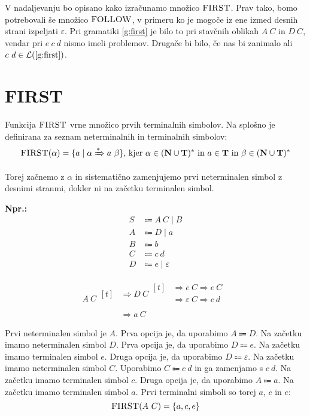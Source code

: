 \documentclass{article}
\newcommand{\Ex}{\textbf{Npr.:}\ }
\newcommand{\FIRST}{\textsc{FIRST}}
\newcommand{\FOLLOW}{\textsc{FOLLOW}}
\newcommand{\Set}[1]{\mathbf{#1}}
\newcommand{\Terminals}{\Set{T}}
\newcommand{\NonTerminals}{\Set{N}}
\newcommand{\Null}{\varepsilon}
\newcommand{\Language}[1]{\mathcal{L}(#1)}
\newcommand{\Arrow}{\Coloneqq}
\newcommand{\Derive}{\Rightarrow}
\newcommand{\DeriveStar}{\xRightarrow{\ast}}
\newcommand{\Seq}{\ }
\newcommand{\Union}{\mathrel{|}}
\newcommand{\Kleene}[1]{#1^\ast}
\begin{document}
V nadaljevanju bo opisano kako izračunamo množico $\FIRST$.
Prav tako, bomo potrebovali še množico $\FOLLOW$, v primeru ko je mogoče iz ene izmed desnih strani izpeljati $\Null$.
Pri gramatiki \ref{g:first} je bilo to pri stavčnih oblikah $A \Seq C$ in $D \Seq C$, vendar pri $e \Seq c \Seq d$ nismo imeli problemov.
Drugače bi bilo, če nas bi zanimalo ali $c \Seq d \in \Language{\text{\ref{g:first}}}$.

\section{\FIRST}

Funkcija $\FIRST$ vrne množico prvih terminalnih simbolov.
Na splošno je definirana za seznam neterminalnih in terminalnih simbolov:
\begin{equation*}
  \FIRST(\alpha) = \{ a \mid \alpha \DeriveStar a \Seq \beta \} \text{, kjer } \alpha \in \Kleene{(\NonTerminals \cup \Terminals)} \text{ in } a \in \Terminals \text{ in } \beta \in \Kleene{(\NonTerminals \cup \Terminals)}
\end{equation*}

Torej začnemo z $\alpha$ in sistematično zamenjujemo prvi neterminalen simbol z desnimi stranmi, dokler ni na začetku terminalen simbol.

\Ex
\begin{equation*}
  \begin{aligned}
    S &\Arrow A \Seq C \Union B \\
    A &\Arrow D \Union a \\
    B &\Arrow b\\
    C &\Arrow c \Seq d\\
    D &\Arrow e \Union \Null
  \end{aligned}
\end{equation*}

\begin{equation*}
  A \Seq C \begin{aligned}[t]
    &\Derive D \Seq C \begin{aligned}[t]
      &\Derive e \Seq C \Derive e \Seq C \\
      &\Derive \Null \Seq C \Derive c \Seq d \\
    \end{aligned}\\
    &\Derive a \Seq C
  \end{aligned}
\end{equation*}

Prvi neterminalen simbol je $A$.
Prva opcija je, da uporabimo $A \Arrow D$.
Na začetku imamo neterminalen simbol $D$.
Prva opcija je, da uporabimo $D \Arrow e$.
Na začetku imamo terminalen simbol $e$.
Druga opcija je, da uporabimo $D \Arrow \Null$.
Na začetku imamo neterminalen simbol $C$.
Uporabimo $C \Arrow c \Seq d$ in ga zamenjamo s $c \Seq d$.
Na začetku imamo terminalen simbol $c$.
Druga opcija je, da uporabimo $A \Arrow a$.
Na začetku imamo terminalen simbol $a$.
Prvi terminalni simboli so torej $a$, $c$ in $e$:
\begin{equation*}
  \FIRST(A \Seq C) = \{a, c, e\}
\end{equation*}
\end{document}

